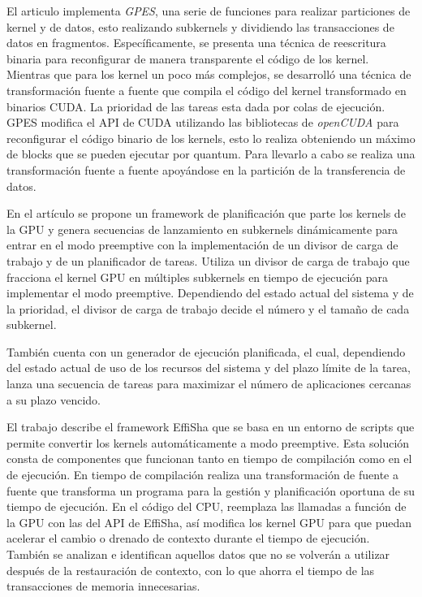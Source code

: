 El articulo \cite{GPES} implementa \textit{GPES}, una serie de funciones para realizar particiones de kernel y de datos, esto realizando subkernels y dividiendo las transacciones de datos en fragmentos. 
Específicamente, se presenta una técnica de reescritura binaria para reconfigurar de manera transparente el código de los kernel. Mientras que para los kernel un poco más complejos, se desarrolló una técnica de transformación fuente a fuente que compila el código del kernel transformado en binarios CUDA. La prioridad de las tareas esta dada por colas de ejecución. GPES modifica el API de CUDA utilizando las bibliotecas de  \textit{openCUDA} para reconfigurar el código binario de los kernels, esto lo realiza obteniendo un máximo de blocks que se pueden ejecutar por quantum. Para llevarlo a cabo se realiza una transformación fuente a fuente apoyándose en la partición de la transferencia de datos.
\newline

En el artículo \cite{RTFG} se propone un framework de planificación que parte los kernels de la GPU y genera secuencias de lanzamiento en subkernels dinámicamente para entrar en el modo preemptive con la implementación de un divisor de carga de trabajo y de un planificador de tareas. 
Utiliza un divisor de carga de trabajo que fracciona el kernel GPU en múltiples subkernels en tiempo de ejecución para implementar el modo preemptive. Dependiendo del estado actual del sistema y de la prioridad, el divisor de carga de trabajo decide el número y el tamaño de cada subkernel. 

También cuenta con un generador de ejecución planificada, el cual, dependiendo del estado actual de uso de los recursos del sistema y del plazo límite de la tarea, lanza una secuencia de tareas para maximizar el número de aplicaciones cercanas a su plazo vencido.	
\newline

El trabajo \cite{Effisha} describe el framework EffiSha que se basa en un entorno de scripts que permite convertir los kernels automáticamente a modo preemptive. Esta solución consta de componentes que funcionan tanto en tiempo de compilación como en el de ejecución. 
En tiempo de compilación realiza una transformación de fuente a fuente que transforma un programa para la gestión y planificación oportuna de su tiempo de ejecución.
En el código del CPU, reemplaza las llamadas a función de la GPU con las del API de EffiSha, así modifica los kernel GPU para que puedan acelerar el cambio o drenado de contexto durante el tiempo de ejecución. También se analizan e identifican aquellos datos que no se volverán a utilizar después de la restauración de contexto, con lo que ahorra el tiempo de las transacciones de memoria innecesarias.

